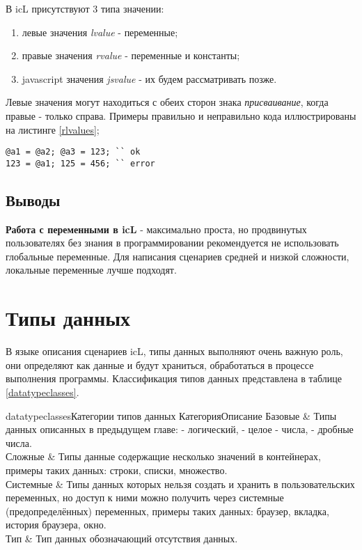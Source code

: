 \documentclass[a4paper, 14pt]{extarticle}
\newenvironment{icEnum}
	{ \begin{enumerate}[noitemsep,nolistsep] }
	{ \end{enumerate} }
\begin{document}
В icL присутствуют 3 типа значении:
	
\begin{icEnum}
	\item левые значения {\it lvalue} - переменные;
	\item правые значения {\it rvalue} - переменные и константы;
	\item javascript значения {\it jsvalue} - их будем рассматривать позже.
\end{icEnum}
	
Левые значения могут находиться с обеих сторон знака {\it присваивание}, когда правые - только справа. Примеры правильно и неправильно кода иллюстрированы на листинге \ref{rlvalues};
	
\begin{lstlisting}[caption=Левые и правые значения, label=rlvalues]
@a1 = @a2; @a3 = 123; `` ok
123 = @a1; 125 = 456; `` error 
\end{lstlisting}

\subsection{Выводы}

{\bf Работа с переменными в icL} - максимально проста, но продвинутых пользователях без знания в программировании рекомендуется не использовать глобальные переменные. Для написания сценариев средней и низкой сложности, локальные переменные лучше подходят. 

\section{Типы данных}

В языке описания сценариев icL, типы данных выполняют очень важную роль, они определяют как данные и будут храниться, обработаться в процессе выполнения программы. Классификация типов данных представлена в таблице \ref{datatypeclasses}.
	
\stabletwo{3.5cm}{13.6cm}
{datatypeclasses}{Категории типов данных}
{Категория}{Описание}
{
	Базовые & Типы данных описанных в предыдущем главе:  - логический,  - целое - числа,  - дробные числа. \\ \hline
	Сложные & Типы данные содержащие несколько значений в контейнерах, примеры таких данных: строки, списки, множество. \\ \hline
	Системные & Типы данных которых нельзя создать и хранить в пользовательских переменных, но доступ к ними можно получить через системные (предопределённых) переменных, примеры таких данных: браузер, вкладка, история браузера, окно. \\ \hline
	Тип  & Тип данных обозначающий отсутствия данных.
}
	
\end{document}
